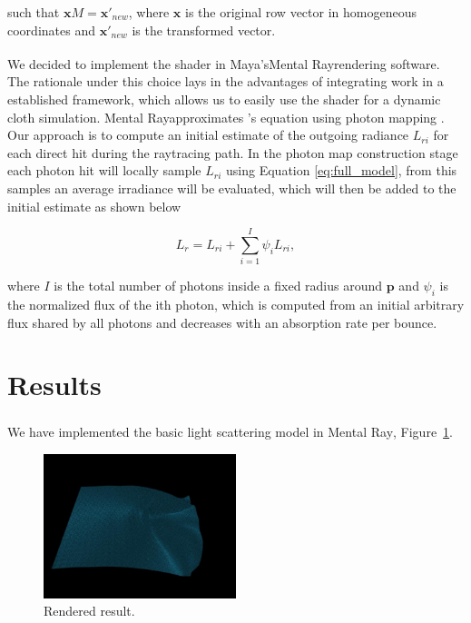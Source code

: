\documentclass[12pt]{article}
\begin{document}
such that $\mathbf{x}M=\mathbf{x}'_{new}$, where $\mathbf{x}$ is the original row vector in homogeneous coordinates and $\mathbf{x}'_{new}$ is the transformed vector.

We decided to implement the shader in Maya's\textsuperscript\textregistered Mental Ray\textsuperscript\textregistered rendering software.
The rationale under this choice lays in the advantages of integrating work in a established framework, which allows us to easily use the shader for a dynamic cloth simulation.
Mental Ray\texttrademark approximates \citeauthor{Kajiya1986}'s equation \cite{Kajiya1986} using photon mapping \cite{Jensen1996}.
Our approach is to compute an initial estimate of the outgoing radiance $L_{ri}$ for each direct hit during the raytracing path.
In the photon map construction stage each photon hit will locally sample $L_{ri}$ using Equation \ref{eq:full_model}, from this samples an average irradiance will be evaluated, which will then be added to the initial estimate as shown below

\begin{equation}
L_r = L_{ri} + \sum_{i = 1}^{I} \psi_i L_{ri},
\end{equation}

where $I$ is the total number of photons inside a fixed radius around $\mathbf{p}$ and $\psi_i$ is the normalized flux of the ith photon, which is computed from an initial arbitrary flux shared by all photons and decreases with an absorption rate per bounce.

\section{Results}

We have implemented the basic light scattering model in Mental Ray\textsuperscript\textregistered, Figure~\ref{fig:result1}.

\begin{figure}[htbp!]
\centering
\includegraphics[width=0.5\textwidth]{images/result1}
	\caption{Rendered result.}
	\label{fig:result1}
\end{figure}
\end{document}
